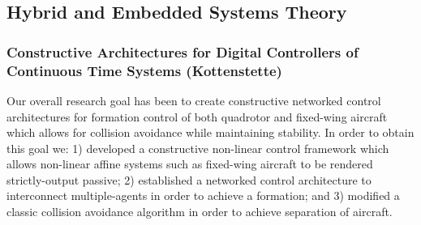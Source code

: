 \subsection{Hybrid and Embedded Systems Theory} 





            \subsubsection{Constructive Architectures for Digital Controllers of Continuous Time Systems (Kottenstette)}

Our overall research goal has been to create constructive networked control architectures for formation control of both quadrotor and fixed-wing aircraft which allows for collision avoidance while maintaining stability.  In order to obtain this goal we: 1) developed a constructive non-linear control framework which allows non-linear affine systems such as fixed-wing aircraft to be rendered strictly-output passive; 2) established a networked control architecture to interconnect multiple-agents in order to achieve a formation; and 3) modified a classic collision avoidance algorithm in order to achieve separation of aircraft.

